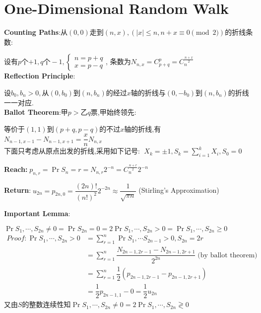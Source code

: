 
\section{One-Dimensional Random Walk}
\textbf{Counting Paths}:从$ (0,0)走到 (n,x),(|x|\le n, n + x\equiv 0 \pmod 2)$的折线条数:

  设有$ p$个$ +1,q个-1,\begin{cases}n=p+q\\x=p-q \end{cases}$,
  条数为$ N_{n,x} = C_{p+q}^p = C_{n}^{\frac{n+x}{2}}$
  \\

  \textbf{Reflection Principle}:

  设$ b_0,b_n>0,从(0,b_0)到(n,b_n)$的经过$ x$轴的折线与$(0,-b_0)$到$(n,b_n)$的折线一一对应.
  \\

  \textbf{Ballot Theorem}:甲$ p>$乙$ q$票,甲始终领先:

  等价于$ (1,1)$到$ (p+q,p-q)$的不过$ x$轴的折线,有$ N_{n-1,x-1} -
  N_{n-1,x+1}=\dfrac{x}{n}N_{n,x}$
  \\

  下面只考虑从原点出发的折线,采用如下记号:
  $\; X_k = \pm 1, S_k = \sum_{i=1}^k{X_i},S_0=0$

  \textbf{Reach:}$\; p_{n,r} = \Pr{S_n=r} = N_{n,r}2^{-n} = C_{n}^{\frac{n+r}{2}}2^{-n}$

  \textbf{Return}:$\; u_{2n} = p_{2n,0} = \dfrac{(2n)!}{(n!)^2}2^{-2n}\approx \dfrac{1}{\sqrt{\pi n}}$ (Stirling's Approximation)
  \vspace{0.6cm}

  \textbf{Important Lemma}:

  $ \Pr{S_1,\cdots ,S_{2n}\neq 0} = \Pr{S_{2n}=0}=2\Pr{S_1,\cdots ,S_{2n}>0} =
    \Pr{S_1,\cdots ,S_{2n}\ge 0}$
\begin{align*}
  \textit{Proof}:
   \Pr{S_1,\cdots ,S_{2n}>0} &= \sum_{r=1}^{n}{\Pr{S_1 ,\cdots S_{2n-1}>0,S_{2n}=2r}}\\
   &=\sum_{r=1}^{n}{\dfrac{N_{2n-1,2r-1}-N_{2n-1,2r+1}}{2^{2n}}} \; \text{(by ballot theorem)}\\
   &=\sum_{r=1}^n{\dfrac{1}{2}(p_{2n-1,2r-1}-p_{2n-1,2r+1})} \\
   &=\dfrac{1}{2}p_{2n-1,1}-0 = \dfrac{1}{2}u_{2n}
\end{align*}
又由$ S$的整数连续性知$ \Pr{S_1,\cdots ,S_{2n}\neq0}=2\Pr{S_1,\cdots ,S_{2n}\gtrless 0}$

